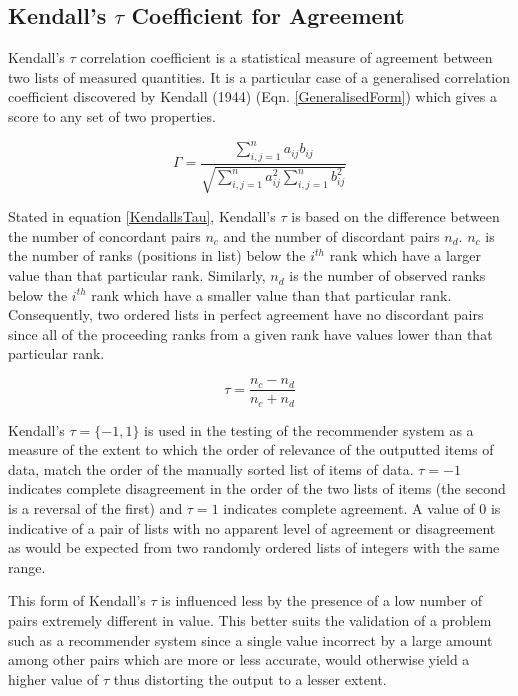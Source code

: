 \subsection{Kendall's $\tau$ Coefficient for Agreement}

Kendall's $\tau$ correlation coefficient is a statistical measure of agreement between two lists of measured quantities. It is a particular case of a generalised correlation coefficient discovered by Kendall (1944) (Eqn. \ref{GeneralisedForm}) which gives a score to any set of two properties. 

\begin{equation}\label{GeneralisedForm}	
	\Gamma  = \frac{\sum_{i,j=1}^{n}a_{ij}b_{ij}}{\sqrt{\sum_{i,j=1}^{n}a_{ij}^2\sum_{i,j=1}^{n}b_{ij}^2}} 
\end{equation}

Stated in equation \ref{KendallsTau}, Kendall's $\tau$ is based on the difference between the number of concordant pairs $n_c$ and the number of discordant pairs $n_d$. $n_c$ is the number of ranks (positions in list) below the $i^{th}$ rank which have a larger value than that particular rank. Similarly, $n_d$ is the number of observed ranks below the $i^{th}$ rank which have a smaller value than that particular rank. Consequently, two ordered lists in perfect agreement have no discordant pairs since all of the proceeding ranks from a given rank have values lower than that particular rank. 

\begin{equation}\label{KendallsTau}	
	\tau  = \frac{n_c - n_d}{n_c+n_d} 
\end{equation}

Kendall's $\tau = \{-1, 1\}$ is used in the testing of the recommender system as a measure of the extent to which the order of relevance of the outputted items of data, match the order of the manually sorted list of items of data. $\tau = -1$ indicates complete disagreement in the order of the two lists of items (the second is a reversal of the first) and $\tau = 1$ indicates complete agreement. A value of $0$ is indicative of a pair of lists with no apparent level of agreement or disagreement as would be expected from two randomly ordered lists of integers with the same range.  

This form of Kendall's $\tau$ is influenced less by the presence of a low number of pairs extremely different in value. This better suits the validation of a problem such as a recommender system since a single value incorrect by a large amount among other pairs which are more or less accurate, would otherwise yield a higher value of $\tau$ thus distorting the output to a lesser extent. 

